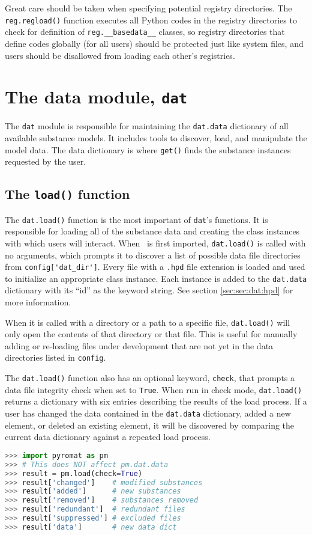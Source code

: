 Great care should be taken when specifying potential registry directories.  The \texttt{reg.regload()} function executes all Python codes in the registry directories to check for definition of \verb|reg.__basedata__| classes, so registry directories that define codes globally (for all users) should be protected just like system files, and users should be disallowed from loading each other's registries.

\section{The data module, \texttt{dat}}

The \texttt{dat} module is responsible for maintaining the \texttt{dat.data} dictionary of all available substance models.  It includes tools to discover, load, and manipulate the model data.  The data dictionary is where \texttt{get()} finds the substance instances requested by the user.

\subsection{The \texttt{load()} function}\label{sec:dat:load}

The \texttt{dat.load()} function is the most important of \texttt{dat}'s functions.  It is responsible for loading all of the substance data and creating the class instances with which users will interact.  When \PM\ is first imported, \texttt{dat.load()} is called with no arguments, which prompts it to discover a list of possible data file directories from \verb|config['dat_dir']|.  Every file with a \texttt{.hpd} file extension is loaded and used to initialize an appropriate class instance.  Each instance is added to the \texttt{dat.data} dictionary with its ``id'' as the keyword string.  See section \ref{sec:sec:dat:hpd} for more information.

When it is called with a directory or a path to a specific file, \texttt{dat.load()} will only open the contents of that directory or that file.  This is useful for manually adding or re-loading files under development that are not yet in the data directories listed in \texttt{config}.

The \texttt{dat.load()} function also has an optional keyword, \texttt{check}, that prompts a data file integrity check when set to \texttt{True}.  When run in check mode, \texttt{dat.load()} returns a dictionary with six entries describing the results of the load process.  If a user has changed the data contained in the \texttt{dat.data} dictionary, added a new element, or deleted an existing element, it will be discovered by comparing the current data dictionary against a repeated load process.
\begin{lstlisting}[language=Python]
>>> import pyromat as pm
>>> # This does NOT affect pm.dat.data
>>> result = pm.load(check=True)
>>> result['changed']    # modified substances
>>> result['added']      # new substances
>>> result['removed']    # substances removed 
>>> result['redundant']  # redundant files
>>> result['suppressed'] # excluded files
>>> result['data']       # new data dict
\end{lstlisting}

